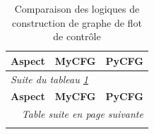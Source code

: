 \documentclass[11pt,a4paper]{article}
\begin{document}
\begin{longtable}{|p{3cm}|p{7cm}|p{6cm}|}
  \caption{Comparaison des logiques de construction de graphe de flot de contrôle}
  \label{tab:comparatif}
  \\ \hline
  \textbf{Aspect} & \textbf{MyCFG} & \textbf{PyCFG} \\
  \hline
  \endfirsthead

  \multicolumn{3}{l}{\small\slshape Suite du tableau \ref{tab:comparatif}}\\
  \hline
  \textbf{Aspect} & \textbf{MyCFG} & \textbf{PyCFG} \\
  \hline
  \endhead

  \hline
  \multicolumn{3}{r}{\small\slshape Table suite en page suivante} \\
  \endfoot

  \hline
  \endlastfoot


\end{longtable}
\end{document}
